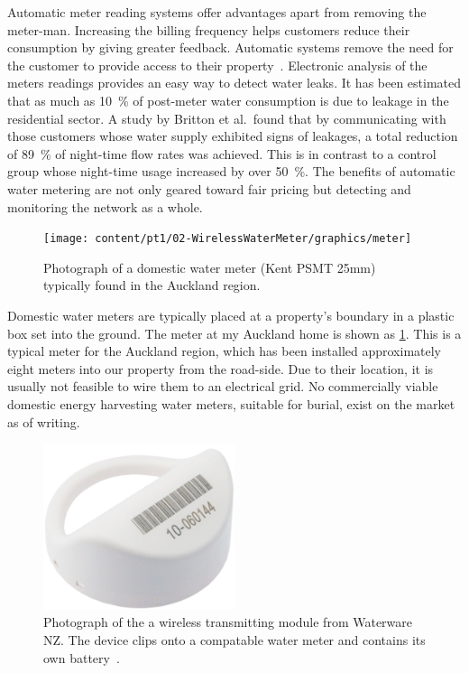   Automatic meter reading systems offer advantages apart from removing the meter-man.
  Increasing the billing frequency helps customers reduce their consumption by giving greater feedback.
  Automatic systems remove the need for the customer to provide access to their property~\cite{Chang2012}.
  Electronic analysis of the meters readings provides an easy way to detect water leaks.
  It has been estimated that as much as \SI{10}{\percent} of post-meter water consumption is due to leakage in the residential sector.
  A study by Britton et al.\ found that by communicating with those customers whose water supply exhibited signs of leakages, a total reduction of  \SI{89}{\percent} of night-time flow rates was achieved.
  This is in contrast to a control group whose night-time usage increased by over \SI{50}{\percent}.
  The benefits of automatic water metering are not only geared toward fair pricing but detecting and monitoring the network as a whole.

  \begin{figure}
    \centering
    \texttt{[image: content/pt1/02-WirelessWaterMeter/graphics/meter]}
    \caption{\label{fig:Photo_DomesticWaterMeter}Photograph of a domestic water meter (Kent PSMT 25mm) typically found in the Auckland region.}
  \end{figure}

  Domestic water meters are typically placed at a property's boundary in a plastic box set into the ground.
  The meter at my Auckland home is shown as \cref{fig:Photo_DomesticWaterMeter}.
  This is a typical meter for the Auckland region, which has been installed approximately eight meters into our property from the road-side.
  Due to their location, it is usually not feasible to wire them to an electrical grid.
  No commercially viable domestic energy harvesting water meters, suitable for burial, exist on the market as of writing.

  \begin{figure}
    \centering
    \includegraphics[width=0.5\textwidth]{content/pt1/02-WirelessWaterMeter/graphics/hydro-WMBUSWLESSM}
    \caption{\label{fig:Photo_waterwareMeter}Photograph of the a wireless transmitting module from Waterware NZ. The device clips onto a compatable water meter and contains its own battery~\cite{BMeters2014}.}
  \end{figure}

